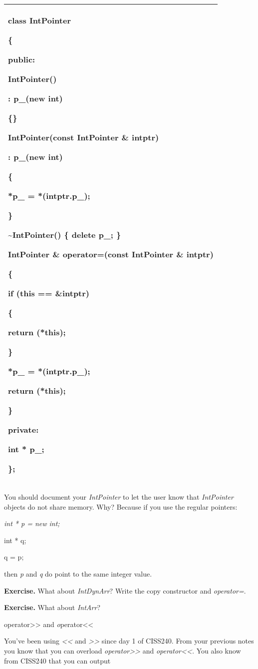 \documentclass[
]{article}
\begin{document}
\begin{longtable}[]{@{}l@{}}
\toprule
\endhead
\begin{minipage}[t]{0.97\columnwidth}\raggedright
class IntPointer

\{

public:

IntPointer()

: p\_(new int)

\{\}

IntPointer(const IntPointer \& intptr)

: p\_(new int)

\{

*p\_ = *(intptr.p\_);

\}

\textasciitilde IntPointer() \{ delete p\_; \}

IntPointer \& operator=(const IntPointer \& intptr)

\{

if (this == \&intptr)

\{

return (*this);

\}

*p\_ = *(intptr.p\_);

return (*this);

\}

private:

int * p\_;

\};\strut
\end{minipage}\tabularnewline
\bottomrule
\end{longtable}

You should document your \emph{IntPointer} to let the user know that
\emph{IntPointer} objects do not share memory. Why? Because if you use
the regular pointers:

\emph{int * p = new int;}

int * q;

q = p;

then \emph{p} and \emph{q} do point to the same integer value.

\textbf{Exercise.} What about \emph{IntDynArr}? Write the copy
constructor and \emph{operator=}.

\textbf{Exercise. }What about \emph{IntArr}?

operator\textgreater\textgreater{} and
\emph{o}perator\textless\textless{}

You've been using \emph{\textless\textless{}} and
\emph{\textgreater\textgreater{}} since day 1 of CISS240. From your
previous notes you know that you can overload
\emph{operator\textgreater\textgreater{}} and
\emph{operator\textless\textless.} You also know from CISS240 that you
can output
\end{document}
